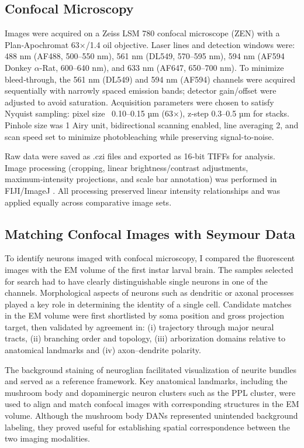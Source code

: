     \subsection{Confocal Microscopy}
    Images were acquired on a Zeiss LSM 780 confocal microscope (ZEN) with a Plan‑Apochromat 63×/1.4 oil objective. Laser lines and detection windows were: 488 nm (AF488, 500–550 nm), 561 nm (DL549, 570–595 nm), 594 nm (AF594 Donkey $\alpha$-Rat, 600–640 nm), and 633 nm (AF647, 650–700 nm). To minimize bleed‑through, the 561 nm (DL549) and 594 nm (AF594) channels were acquired sequentially with narrowly spaced emission bands; detector gain/offset were adjusted to avoid saturation.
    Acquisition parameters were chosen to satisfy Nyquist sampling: pixel size ~0.10–0.15 µm (63×), z‑step 0.3–0.5 µm for stacks. Pinhole size was 1 Airy unit, bidirectional scanning enabled, line averaging 2, and scan speed set to minimize photobleaching while preserving signal-to-noise.

    Raw data were saved as .czi files and exported as 16‑bit TIFFs for analysis. Image processing (cropping, linear brightness/contrast adjustments, maximum‑intensity projections, and scale bar annotation) was performed in FIJI/ImageJ \citep{schindelin2012fiji}. All processing preserved linear intensity relationships and was applied equally across comparative image sets.

    \subsection{Matching Confocal Images with Seymour Data} 
    
    To identify neurons imaged with confocal microscopy, I compared the fluorescent images with the EM volume of the first instar larval brain.
    The samples selected for search had to have clearly distinguishable single neurons in one of the channels. Morphological aspects of neurons such as dendritic or axonal processes played a key role in determining the identity of a single cell. Candidate matches in the EM volume were first shortlisted by soma position and gross projection target, then validated by agreement in: (i) trajectory through major neural tracts, (ii) branching order and topology, (iii) arborization domains relative to anatomical landmarks and (iv) axon–dendrite polarity.  
    
    The background staining of neuroglian facilitated visualization of neurite bundles and served as a reference framework. Key anatomical landmarks, including the mushroom body and dopaminergic neuron clusters such as the PPL cluster, were used to align and match confocal images with corresponding structures in the EM volume. Although the mushroom body DANs represented unintended background labeling, they proved useful for establishing spatial correspondence between the two imaging modalities. 

